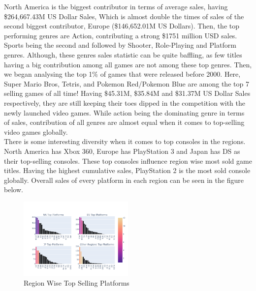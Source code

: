\documentclass[conference]{IEEEtran}
\begin{document}
North America is the biggest contributor in terms of average sales, having \$264,667.43M US Dollar Sales, Which is almost double the times of sales of the second biggest contributor, Europe (\$146,652.01M US Dollars). Then, the top performing genres are Action, contributing a strong \$1751 million USD sales. Sports being the second and followed by Shooter, Role-Playing and Platform genres. Although, these genres sales statistic can be quite baffling, as few titles having a big contribution among all games are not among these top genres. Then, we began analysing the top 1\% of games that were released before 2000. Here, Super Mario Bros, Tetris, and Pokemon Red/Pokemon Blue are among the top 7 selling games of all time! Having \$45.31M, \$35.84M and \$31.37M US Dollar Sales respectively, they are still keeping their toes dipped in the competition with the newly launched video games. While action being the dominating genre in terms of sales, contribution of all genres are almost equal when it comes to top-selling video games globally. \\
There is some interesting diversity when it comes to top consoles in the regions. North America has Xbox 360, Europe has PlayStation 3 and Japan has DS as their top-selling consoles. These top consoles influence region wise most sold game titles. Having the highest cumulative sales, PlayStation 2 is the most sold console globally. Overall sales of every platform in each region can be seen in the figure below.\\
\begin{figure}[h]
    \centering
    \includegraphics[width=0.5\textwidth]{regionplatform.png}
    \caption{Region Wise Top Selling Platforms}
\end{figure}
\end{document}
